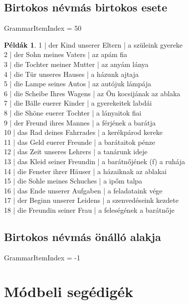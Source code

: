 \documentclass{article}
\theoremstyle{definition}
\newtheorem*{exmp}{Példák}
\begin{document}
\subsection{Birtokos névmás birtokos esete}

GrammarItemIndex = 50

\begin{exmp}	%
1 | der Kind unserer Eltern | a szüleink gyereke\\
2 | der Sohn meines Vaters | az apám fia\\
3 | die Tochter meiner Mutter | az anyám lánya\\
4 | die Tür unseres Hauses | a házunk ajtaja\\
5 | die Lampe seines Autos | az autójuk lámpája\\
6 | die Scheibe Ihres Wagens | az Ön kocsijának az ablaka\\
7 | die Bälle euerer Kinder | a gyerekeitek labdái\\
8 | die Shöne euerer Tochter | a lányaitok fiai\\
9 | der Freund ihres Mannes | a férjének a barátja\\
10 | das Rad deines Fahrrades | a kerékpárod kereke\\
11 | das Geld euerer Freunde | a barátaitok pénze\\
12 | das Zeit unseres Lehrers | a tanárunk ideje\\
13 | das Kleid seiner Freundin | a barátnőjének (f) a ruhája\\
14 | die Fenster ihrer Häuser | a házaiknak az ablakai\\
15 | die Sohle meines Schuches | a ipőm talpa\\
16 | das Ende unserer Aufgaben | a feladataink vége\\
17 | der Beginn unserer Leidens | a szenvedéseink kezdete\\
18 | die Freundin seiner Frau | a feleségének a barátnője\\
\end{exmp}

\subsection{Birtokos névmás önálló alakja}

GrammarItemIndex = -1

\section{Módbeli segédigék}
\end{document}
